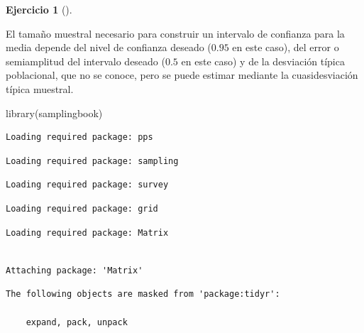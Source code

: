 \documentclass[
  a4paper,
]{scrreport}
\newenvironment{Shaded}{\begin{snugshade}}{\end{snugshade}}
\newcommand{\FunctionTok}[1]{\textcolor[rgb]{0.28,0.35,0.67}{#1}}
\newcommand{\NormalTok}[1]{\textcolor[rgb]{0.00,0.23,0.31}{#1}}
\theoremstyle{definition}
\newtheorem{exercise}{Ejercicio}[chapter]
\theoremstyle{remark}
\begin{document}
\begin{exercise}[]
\begin{enumerate}
  \begin{tcolorbox}[enhanced jigsaw, coltitle=black, left=2mm, colback=white, leftrule=.75mm, toptitle=1mm, breakable, bottomrule=.15mm, titlerule=0mm, bottomtitle=1mm, title=\textcolor{quarto-callout-tip-color}{\faLightbulb}\hspace{0.5em}{Solución}, arc=.35mm, toprule=.15mm, rightrule=.15mm, colframe=quarto-callout-tip-color-frame, opacityback=0, colbacktitle=quarto-callout-tip-color!10!white, opacitybacktitle=0.6]

  El tamaño muestral necesario para construir un intervalo de confianza
  para la media depende del nivel de confianza deseado (\(0.95\) en este
  caso), del error o semiamplitud del intervalo deseado (\(0.5\) en este
  caso) y de la desviación típica poblacional, que no se conoce, pero se
  puede estimar mediante la cuasidesviación típica muestral.

\begin{Shaded}
\begin{Highlighting}[]
\FunctionTok{library}\NormalTok{(samplingbook)}
\end{Highlighting}
\end{Shaded}

\begin{verbatim}
Loading required package: pps
\end{verbatim}

\begin{verbatim}
Loading required package: sampling
\end{verbatim}

\begin{verbatim}
Loading required package: survey
\end{verbatim}

\begin{verbatim}
Loading required package: grid
\end{verbatim}

\begin{verbatim}
Loading required package: Matrix
\end{verbatim}

\begin{verbatim}

Attaching package: 'Matrix'
\end{verbatim}

\begin{verbatim}
The following objects are masked from 'package:tidyr':

    expand, pack, unpack
\end{verbatim}


\end{tcolorbox}
\end{enumerate}
\end{exercise}
\end{document}
